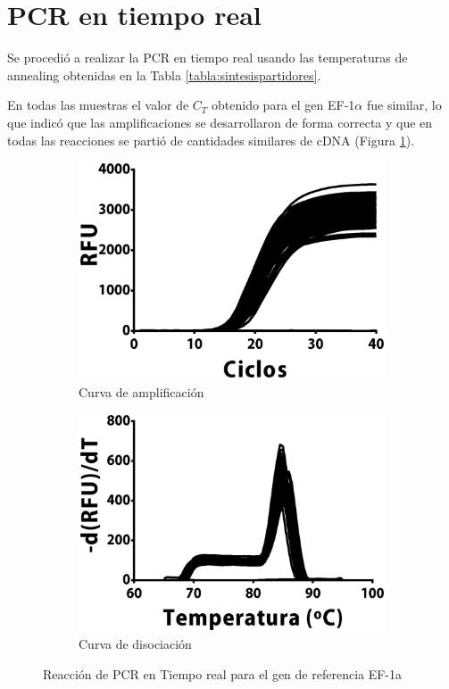 \documentclass[12pt,letterpaper,oneside]{scrbook}
\begin{document}
\section{PCR en tiempo real}

Se procedió a realizar la PCR en tiempo real usando las temperaturas de
annealing obtenidas en la Tabla \ref{tabla:sintesispartidores}.

En todas las muestras el valor de \(C_T\) obtenido para el gen
EF-1\(\alpha\) fue similar, lo que indicó que las amplificaciones se
desarrollaron de forma correcta y que en todas las reacciones se partió
de cantidades similares de cDNA (Figura \ref{qef1a}).

\begin{figure}[h!]
    \centering
    \begin{subfigure}{0.32\textwidth}
        \includegraphics[width=1\textwidth]{qef1a}
        \caption{Curva de amplificación}
        \end{subfigure}
    \begin{subfigure}{0.32\textwidth}
        \includegraphics[width=01\textwidth]{qef1am}
        \caption{Curva de disociación}
    \end{subfigure}
    \caption{Reacción de PCR en Tiempo real para el gen de referencia EF-1a}
    \label{qef1a}
\end{figure}
\end{document}
